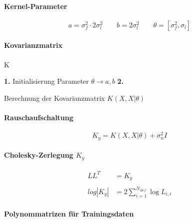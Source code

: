\paragraph*{Kernel-Parameter}


\begin{equation}\label{eq:kparam}
	a = \sigma_f^2 \cdot 2 \sigma_l^2 \qquad b = 2 \sigma_l^2 \qquad \theta = \left[\sigma_f^2, \sigma_l\right]
\end{equation}


\paragraph*{Kovarianzmatrix}
K

\begin{algorithm}
	\SetAlgoLined
	\textbf{1.} Initialisierung Parameter $\theta \rightarrow a,b$\;
	\textbf{2.} 
	\caption{Berechnung der Kovarianzmatrix $K(X, X|\theta)$}
	\label{alg:k-matrix}
\end{algorithm}


\paragraph*{Rauschaufschaltung}


\begin{equation}\label{eq:addnoise}
	K_y = K(X, X|\theta) + \sigma_n^2 I
\end{equation}


\paragraph*{Cholesky-Zerlegung $K_y$}


\begin{align}\label{eq:chol}
		 LL^T &= K_y \\ \nonumber \\
	log |K_y| &= 2 \sum_{i=1}^{N_{Ref}} \log L_{i,i}
\end{align}


\paragraph*{Polynommatrizen für Trainingsdaten}


